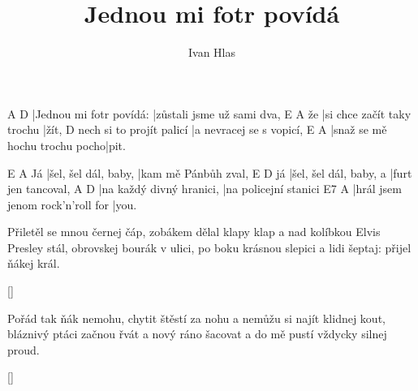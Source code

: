 \documentclass{song}
\title{Jednou mi fotr povídá}
\author{Ivan Hlas}
\begin{document}
\strophe
A\7						D\7
|Jednou mi fotr povídá: |zůstali jsme už sami dva,
   E\7						  A\7
že |si chce začít taky trochu |žít,
						 D\7
nech si to projít palicí |a nevracej se s vopicí,
E\7							  A\7
|snaž se mě hochu trochu pocho|pit.
\endstrophe

   E\7                  A\7
Já |šel, šel dál, baby, |kam mě Pánbůh zval,
   E\7					  D\7
já |šel, šel dál, baby, a |furt jen tancoval,
A\7                      D\7
|na každý divný hranici, |na policejní stanici
E7								 A\7
|hrál jsem jenom rock'n'roll for |you.
\endstrophe

\strophe*
Přiletěl se mnou černej čáp, zobákem dělal klapy klap
a nad kolíbkou Elvis Presley stál,
obrovskej bourák v ulici, po boku krásnou slepici
a lidi šeptaj: přijel ňákej král.
\endstrophe

\ref{}

\strophe*
Pořád tak ňák nemohu, chytit štěstí za nohu
a nemůžu si najít klidnej kout,
bláznivý ptáci začnou řvát a nový ráno šacovat
a do mě pustí vždycky silnej proud.
\endstrophe

\ref{}
\end{document}
